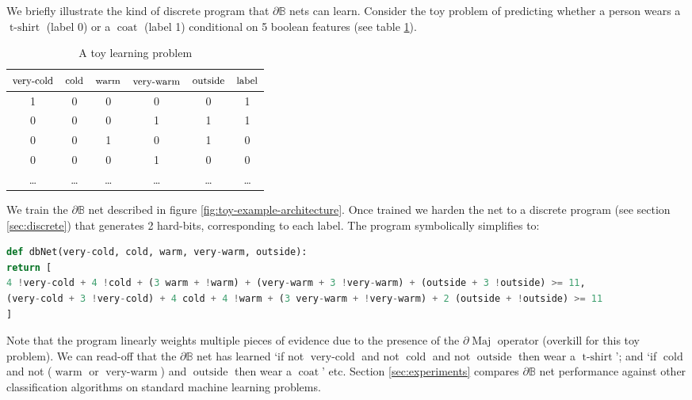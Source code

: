 \documentclass{article}
\theoremstyle{plain}
\theoremstyle{definition}
\theoremstyle{remark}
\begin{document}
We briefly illustrate the kind of discrete program that $\partial\mathbb{B}$ nets can learn. Consider the toy problem of predicting whether a person wears a $\operatorname{t-shirt}$ (label 0) or a $\operatorname{coat}$ (label 1) conditional on 5 boolean features (see table \ref{tab:toy2}).

\begin{table}[h!]
	\centering
	\begin{tabular}{|c|c|c|c|c|c|}
		$\text{\small very-cold}$ & $\text{\small cold}$ & $\text{\small warm}$ & $\text{\small very-warm}$ & $\text{\small outside}$ & $\text{\small label}$ \\ \hline
		1 & 0 & 0 & 0 & 0 & 1 \\
		0 & 0 & 0 & 1 & 1 & 1 \\
		0 & 0 & 1 & 0 & 1 & 0 \\
		0 & 0 & 0 & 1 & 0 & 0 \\
		\dots & \dots & \dots & \dots & \dots & \dots
	\end{tabular}
	\caption{A toy learning problem}
	\label{tab:toy2}
\end{table}

We train the $\partial\mathbb{B}$ net described in figure \ref{fig:toy-example-architecture}. Once trained we harden the net to a discrete program (see section \ref{sec:discrete}) that generates 2 hard-bits, corresponding to each label. The program symbolically simplifies to:

\begin{lstlisting}[language=Python,style=mystyle,frame=single]
def dbNet(very-cold, cold, warm, very-warm, outside):
return [
4 !very-cold + 4 !cold + (3 warm + !warm) + (very-warm + 3 !very-warm) + (outside + 3 !outside) >= 11,
(very-cold + 3 !very-cold) + 4 cold + 4 !warm + (3 very-warm + !very-warm) + 2 (outside + !outside) >= 11
]
\end{lstlisting}

Note that the program linearly weights multiple pieces of evidence due to the presence of the $\partial\!\operatorname{Maj}$ operator (overkill for this toy problem). We can read-off that the $\partial\mathbb{B}$ net has learned `if not $\operatorname{very-cold}$ and not $\operatorname{cold}$ and not $\operatorname{outside}$ then wear a $\operatorname{t-shirt}$'; and `if $\operatorname{cold}$ and not ($\operatorname{warm}$ or $\operatorname{very-warm}$) and $\operatorname{outside}$ then wear a $\operatorname{coat}$' etc. Section \ref{sec:experiments} compares $\partial\mathbb{B}$ net performance against other classification algorithms on standard machine learning problems.
\end{document}
